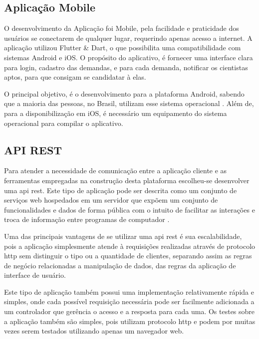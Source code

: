 \subsection{Aplicação Mobile}\label{subsec:app}

O desenvolvimento da Aplicação foi Mobile, pela facilidade e praticidade dos usuários se conectarem de qualquer lugar, requerindo apenas acesso a internet. A aplicação utilizou Flutter {\&} Dart, o que possibilita uma compatibilidade com sistemas Android e iOS. O propósito do aplicativo, é fornecer uma interface clara para login, cadastro das demandas, e para cada demanda, notificar os cientistas aptos, para que consigam se candidatar à elas.

O principal objetivo, é o desenvolvimento para a plataforma Android, sabendo que a maioria das pessoas, no Brasil, utilizam esse sistema operacional \cite{StatCounter}. Além de, para a disponibilização em iOS, é necessário um equipamento do sistema operacional para compilar o aplicativo.

\subsection{API REST}\label{subsec:apirest}

Para atender a necessidade de comunicação entre a aplicação cliente e as ferramentas empregadas na construção desta plataforma escolheu-se desenvolver uma \gls{api} \gls{rest}. Este tipo de aplicação pode ser descrita como um conjunto de serviços web hospedados em um servidor que expõem um conjunto de funcionalidades e dados de forma pública com o intuito de facilitar as interações e troca de informação entre programas de computador \cite{RestApiBook}.

Uma das principais vantagens de se utilizar uma \gls{api} \gls{rest} é sua escalabilidade, pois a aplicação simplesmente atende à requisições realizadas através de protocolo \gls{http} sem distinguir o tipo ou a quantidade de clientes, separando assim as regras de negócio relacionadas a manipulação de dados, das regras da aplicação de interface de usuário.

Este tipo de aplicação também possui uma implementação relativamente rápida e simples, onde cada possível requisição necessária pode ser facilmente adicionada a um controlador que gerência o acesso e a resposta para cada uma. Os testes sobre a aplicação também são simples, pois utilizam protocolo \gls{http} e podem por muitas vezes serem testados utilizando apenas um navegador web.

